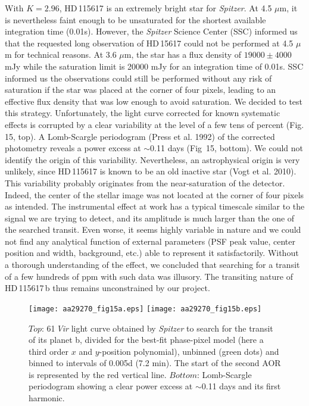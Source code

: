 \documentclass[traditabstract]{aa}
\begin{document}
With $K=2.96$,  HD\,115617 is an extremely bright star for {\it Spitzer}. 
At 4.5 $\mu$m, it is nevertheless faint enough to be unsaturated for the shortest available 
integration time (0.01s). However, the {\it Spitzer} Science Center (SSC) informed us that the requested long observation of HD\,15617 could not be performed at 4.5 $\mu$m for technical reasons. At 3.6 $\mu$m, the star has a flux density 
of $19000 \pm 4000$ mJy while the saturation limit is 20000 mJy for an integration time of 0.01s. 
SSC informed us the observations could still be performed without any risk of saturation if the star was 
placed at the corner of four pixels, leading to an effective flux density that was low enough to avoid saturation. We decided to test this strategy.  
Unfortunately, the  light curve corrected for known systematic effects  is corrupted by a clear variability
at the level of a few tens of percent (Fig. 15, top).  A Lomb-Scargle periodogram (Press et al. 1992) of the corrected photometry 
reveals a power excess at $\sim$0.11 days (Fig~15, bottom). We could not identify the origin of this variability. 
Nevertheless, an astrophysical origin is very unlikely, since HD\,115617 is known to be an old inactive star (Vogt et al. 2010). 
This variability probably originates from the near-saturation of the detector. Indeed, the  center of 
the stellar image was not located at the corner of four pixels as intended.
The instrumental effect at work has a typical timescale similar to the signal we are trying to detect, and its amplitude is much
 larger than the one of the searched transit. Even worse, it seems highly variable in nature and we could not find any analytical function
 of external parameters (PSF peak value, center position and width, background, etc.) able to represent it satisfactorily.  
 Without a thorough understanding of the effect, we concluded that searching for a transit of 
  a few hundreds of ppm with such data was illusory. The transiting nature of HD\,115617\,b thus remains unconstrained by our project. 
   
\begin{figure}
\label{fig:17}
\centering                
\texttt{[image: aa29270\_fig15a.eps]}
\texttt{[image: aa29270\_fig15b.eps]}
\caption{$Top$: 61\,{\it Vir} light curve  obtained by {\it Spitzer} to search for the transit of its planet b, divided for the best-fit phase-pixel model (here a third order $x$ and $y$-position polynomial), unbinned (green dots) and binned to intervals of 0.005d (7.2 min). The start of the second AOR is represented by the red vertical line. $Bottom$: Lomb-Scargle periodogram showing a clear power excess at $\sim$0.11 days and its first harmonic.}
\end{figure}   
\end{document}
